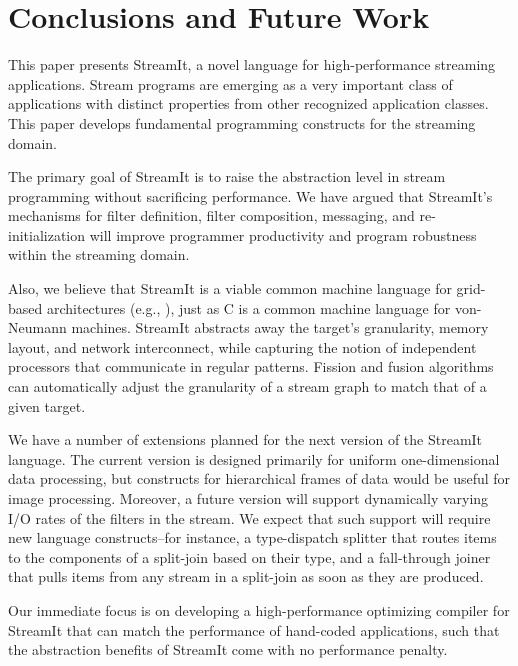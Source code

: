\section{Conclusions and Future Work}
\label{sec:conc}

This paper presents StreamIt, a novel language for high-performance
streaming applications.  Stream programs are emerging as a very
important class of applications with distinct properties from other
recognized application classes.  This paper develops fundamental
programming constructs for the streaming domain.

The primary goal of StreamIt is to raise the abstraction level in
stream programming without sacrificing performance.  We have argued
that StreamIt's mechanisms for filter definition, filter composition,
messaging, and re-initialization will improve programmer productivity
and program robustness within the streaming domain.

Also, we believe that StreamIt is a viable common machine language for
grid-based architectures (e.g., \cite{smartmemories,rawshort,trips}),
just as C is a common machine language for von-Neumann machines.
StreamIt abstracts away the target's granularity, memory layout, and
network interconnect, while capturing the notion of independent
processors that communicate in regular patterns.  Fission and fusion
algorithms can automatically adjust the granularity of a stream graph
to match that of a given target.

We have a number of extensions planned for the next version of the
StreamIt language.  The current version is designed primarily for
uniform one-dimensional data processing, but constructs for hierarchical
frames of data would be useful for image processing.  Moreover, a future
version will support dynamically varying I/O rates of the filters in the
stream.  We expect that such support will require new language
constructs--for instance, a type-dispatch splitter that routes items to
the components of a split-join based on their type, and a fall-through
joiner that pulls items from any stream in a split-join as soon as they
are produced.

Our  immediate focus  is on  developing a  high-performance optimizing
compiler  for StreamIt that  can match  the performance  of hand-coded
applications, such that the abstraction benefits of StreamIt come with
no performance penalty.


